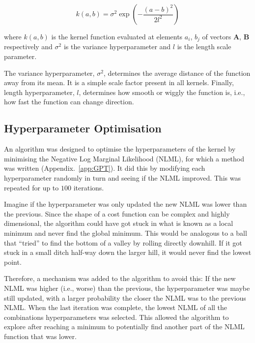 \documentclass[12pt]{article}
\begin{document}
    \begin{equation}
        k(a,b) = \sigma^2 \exp\left(-\frac{(a - b)^2}{2l^2}\right) \label{eq:se-kernel}
    \end{equation}

    \noindent where $k(a,b)$ is the kernel function evaluated at elements $a_i$, $b_j$ of vectors $\mathbf{A}$, $\mathbf{B}$ respectively and $\sigma^2$ is the variance hyperparameter and $l$ is the length scale parameter.

    The variance hyperparameter, $\sigma^2$, determines the average distance of the function away from its mean.
    It is a simple scale factor present in all kernels.
    Finally, length hyperparameter, $l$, determines how smooth or wiggly the function is, i.e., how fast the function can change direction.

    \subsection{Hyperparameter Optimisation}
    An algorithm was designed to optimise the hyperparameters of the kernel by minimising the Negative Log Marginal Likelihood (NLML), for which a method was written (Appendix.~\ref{app:GPT}).
    It did this by modifying each hyperparameter randomly in turn and seeing if the NLML improved.
    This was repeated for up to $100$ iterations.

    Imagine if the hyperparameter was only updated the new NLML was lower than the previous.
    Since the shape of a cost function can be complex and highly dimensional, the algorithm could have got stuck in what is known as a local minimum and never find the global minimum.
    This would be analogous to a ball that ``tried'' to find the bottom of a valley by rolling directly downhill.
    If it got stuck in a small ditch half-way down the larger hill, it would never find the lowest point.

    Therefore, a mechanism was added to the algorithm to avoid this:
    If the new NLML was higher (i.e., worse) than the previous, the hyperparameter was maybe still updated, with a larger probability the closer the NLML was to the previous NLML\@.
    When the last iteration was complete, the lowest NLML of all the combinations hyperparameters was selected.
    This allowed the algorithm to explore after reaching a minimum to potentially find another part of the NLML function that was lower.
\end{document}
